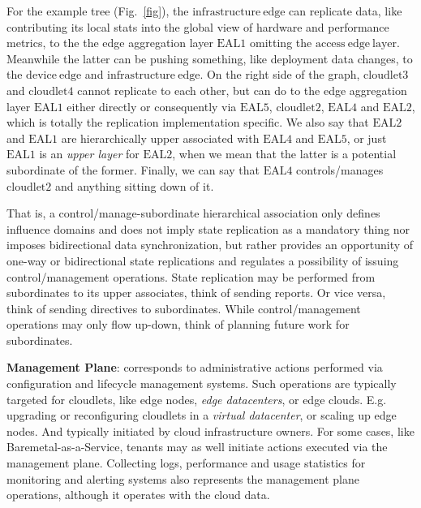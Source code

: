 \documentclass[conference]{IEEEtran}
\begin{document}
For the example tree (Fig.~\ref{fig}), the $\mathrm{infrastructure\ edge}$ can
replicate data, like contributing its local stats into the global view of
hardware and performance metrics, to the the edge aggregation layer
$\mathrm{EAL1}$ omitting the $\mathrm{access\ edge\ layer}$. Meanwhile the
latter can be pushing something, like deployment data changes, to the
$\mathrm{device\ edge}$ and $\mathrm{infrastructure\ edge}$. On the right side
of the graph, $\mathrm{cloudlet3}$ and $\mathrm{cloudlet4}$ cannot replicate to
each other, but can do to the edge aggregation layer $\mathrm{EAL1}$ either
directly or consequently via $\mathrm{EAL5}$, $\mathrm{cloudlet2}$,
$\mathrm{EAL4}$ and $\mathrm{EAL2}$, which is totally the replication
implementation specific. We also say that $\mathrm{EAL2}$ and $\mathrm{EAL1}$
are hierarchically upper associated with $\mathrm{EAL4}$ and $\mathrm{EAL5}$,
or just $\mathrm{EAL1}$ is an \textit{upper layer} for $\mathrm{EAL2}$, when we
mean that the latter is a potential subordinate of the former. Finally, we can
say that $\mathrm{EAL4}$ controls/manages $\mathrm{cloudlet2}$ and anything
sitting down of it.

That is, a control/manage-subordinate hierarchical association only defines
influence domains and does not imply state replication as a mandatory thing nor
imposes bidirectional data synchronization, but rather provides an opportunity
of one-way or bidirectional state replications and regulates a possibility of
issuing control/management operations. State replication may be performed from
subordinates to its upper associates, think of sending reports. Or vice versa,
think of sending directives to subordinates. While control/management
operations may only flow up-down, think of planning future work for
subordinates.

\textbf{Management Plane}: corresponds to administrative actions performed via
configuration and lifecycle management systems. Such operations are typically
targeted for cloudlets, like edge nodes, \textit{edge datacenters}\cite{b3},
or edge clouds. E.g. upgrading or reconfiguring cloudlets in a \textit{virtual
datacenter}\cite{b3}, or scaling up edge nodes. And typically initiated by
cloud infrastructure owners. For some cases, like Baremetal-as-a-Service,
tenants may as well initiate actions executed via the management plane.
Collecting logs, performance and usage statistics for monitoring and alerting
systems also represents the management plane operations, although it operates
with the cloud data.
\end{document}

